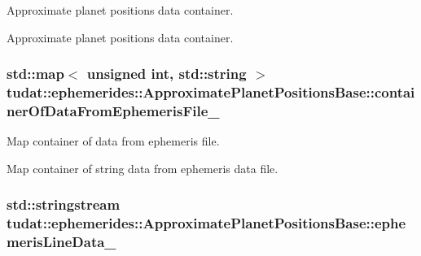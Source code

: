 Approximate planet positions data container. 

Approximate planet positions data container. 
\subsubsection[{\texorpdfstring{container\+Of\+Data\+From\+Ephemeris\+File\+\_\+}{containerOfDataFromEphemerisFile_}}]{\setlength{\rightskip}{0pt plus 5cm}std\+::map$<$ unsigned int, std\+::string $>$ tudat\+::ephemerides\+::\+Approximate\+Planet\+Positions\+Base\+::container\+Of\+Data\+From\+Ephemeris\+File\+\_\+\hspace{0.3cm}{\ttfamily [protected]}}\hypertarget{classtudat_1_1ephemerides_1_1ApproximatePlanetPositionsBase_acfc0c1fc4289411b5d90d1fae6058629}{}\label{classtudat_1_1ephemerides_1_1ApproximatePlanetPositionsBase_acfc0c1fc4289411b5d90d1fae6058629}


Map container of data from ephemeris file. 

Map container of string data from ephemeris data file. 
\subsubsection[{\texorpdfstring{ephemeris\+Line\+Data\+\_\+}{ephemerisLineData_}}]{\setlength{\rightskip}{0pt plus 5cm}std\+::stringstream tudat\+::ephemerides\+::\+Approximate\+Planet\+Positions\+Base\+::ephemeris\+Line\+Data\+\_\+\hspace{0.3cm}{\ttfamily [protected]}}\hypertarget{classtudat_1_1ephemerides_1_1ApproximatePlanetPositionsBase_a9c8716b05a0b4611ba7d25138cf6e9f5}{}\label{classtudat_1_1ephemerides_1_1ApproximatePlanetPositionsBase_a9c8716b05a0b4611ba7d25138cf6e9f5}


